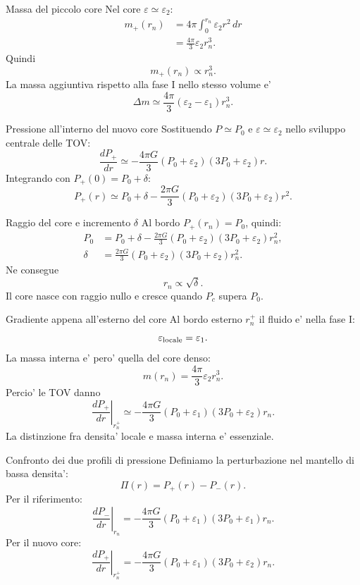 \begin{frame}{Massa del piccolo core}
\small
Nel core $\varepsilon\simeq\varepsilon_2$:
\[
\begin{aligned}
m_+(r_n)
&=4\pi\int_0^{r_n}\varepsilon_2r^2\,dr\\
&=\frac{4\pi}{3}\varepsilon_2r_n^3.
\end{aligned}
\]
Quindi
\[
{m_+(r_n)\propto r_n^3.}
\]
La massa aggiuntiva rispetto alla fase I nello stesso volume e'
\[
\Delta m\simeq\frac{4\pi}{3}
(\varepsilon_2-\varepsilon_1)r_n^3.
\]
\end{frame}

\begin{frame}{Pressione all'interno del nuovo core}
\small
Sostituendo $P\simeq P_0$ e $\varepsilon\simeq\varepsilon_2$
nello sviluppo centrale delle TOV:
\[
\frac{dP_+}{dr}\simeq-\frac{4\pi G}{3}
(P_0+\varepsilon_2)(3P_0+\varepsilon_2)r.
\]
Integrando con $P_+(0)=P_0+\delta$:
\[
{
P_+(r)\simeq P_0+\delta-
\frac{2\pi G}{3}(P_0+\varepsilon_2)
(3P_0+\varepsilon_2)r^2.}
\]
\end{frame}

\begin{frame}{Raggio del core e incremento $\delta$}
\small
Al bordo $P_+(r_n)=P_0$, quindi:
\[
\begin{aligned}
P_0&=P_0+\delta-
\frac{2\pi G}{3}(P_0+\varepsilon_2)
(3P_0+\varepsilon_2)r_n^2,\\
\delta&=\frac{2\pi G}{3}(P_0+\varepsilon_2)
(3P_0+\varepsilon_2)r_n^2.
\end{aligned}
\]
Ne consegue
\[
{r_n\propto\sqrt{\delta}.}
\]
Il core nasce con raggio nullo e cresce quando $P_c$ supera $P_0$.
\end{frame}

\begin{frame}{Gradiente appena all'esterno del core}
\small
Al bordo esterno $r_n^+$ il fluido e' nella fase I:
\[
\varepsilon_{\rm locale}=\varepsilon_1.
\]
La massa interna e' pero' quella del core denso:
\[
m(r_n)=\frac{4\pi}{3}\varepsilon_2r_n^3.
\]
Percio' le TOV danno
\[
{
\left.\frac{dP_+}{dr}\right|_{r_n^+}
\simeq-\frac{4\pi G}{3}(P_0+\varepsilon_1)
(3P_0+\varepsilon_2)r_n.}
\]
La distinzione fra densita' locale e massa interna e' essenziale.
\end{frame}

\begin{frame}{Confronto dei due profili di pressione}
\small
Definiamo la perturbazione nel mantello di bassa densita':
\[
\Pi(r)=P_+(r)-P_-(r).
\]
Per il riferimento:
\[
\left.\frac{dP_-}{dr}\right|_{r_n}
=-\frac{4\pi G}{3}(P_0+\varepsilon_1)
(3P_0+\varepsilon_1)r_n.
\]
Per il nuovo core:
\[
\left.\frac{dP_+}{dr}\right|_{r_n^+}
=-\frac{4\pi G}{3}(P_0+\varepsilon_1)
(3P_0+\varepsilon_2)r_n.
\]
\end{frame}

